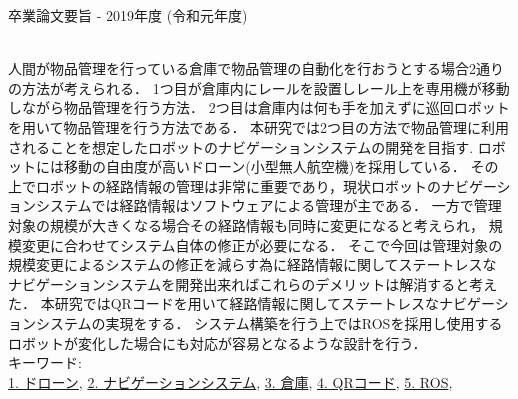 卒業論文要旨 - 2019年度 (令和元年度)
\begin{center}
\begin{large}
\end{large}
\end{center}
~ \\
人間が物品管理を行っている倉庫で物品管理の自動化を行おうとする場合2通りの方法が考えられる．
1つ目が倉庫内にレールを設置しレール上を専用機が移動しながら物品管理を行う方法．
2つ目は倉庫内は何も手を加えずに巡回ロボットを用いて物品管理を行う方法である．
本研究では2つ目の方法で物品管理に利用されることを想定したロボットのナビゲーションシステムの開発を目指す.
ロボットには移動の自由度が高いドローン(小型無人航空機)を採用している．
その上でロボットの経路情報の管理は非常に重要であり，現状ロボットのナビゲーションシステムでは経路情報はソフトウェアによる管理が主である．
一方で管理対象の規模が大きくなる場合その経路情報も同時に変更になると考えられ，
規模変更に合わせてシステム自体の修正が必要になる．
そこで今回は管理対象の規模変更によるシステムの修正を減らす為に経路情報に関してステートレスな
ナビゲーションシステムを開発出来ればこれらのデメリットは解消すると考えた．
本研究ではQRコードを用いて経路情報に関してステートレスなナビゲーションシステムの実現をする．
システム構築を行う上ではROSを採用し使用するロボットが変化した場合にも対応が容易となるような設計を行う．
~ \\
キーワード:\\
\underline{1. ドローン},
\underline{2. ナビゲーションシステム},
\underline{3. 倉庫},
\underline{4. QRコード},
\underline{5. ROS},
\begin{flushright}
\dept \\
\author
\end{flushright}
